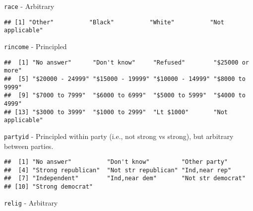 \documentclass[]{article}
\newenvironment{Shaded}{\begin{snugshade}}{\end{snugshade}}
\newcommand{\KeywordTok}[1]{\textcolor[rgb]{0.13,0.29,0.53}{\textbf{#1}}}
\newcommand{\OperatorTok}[1]{\textcolor[rgb]{0.81,0.36,0.00}{\textbf{#1}}}
\newcommand{\NormalTok}[1]{#1}
\theoremstyle{definition}
\theoremstyle{definition}
\theoremstyle{definition}
\theoremstyle{remark}
\begin{document}
\texttt{race} - Arbitrary

\begin{Shaded}
\end{Shaded}

\begin{verbatim}
## [1] "Other"          "Black"          "White"          "Not applicable"
\end{verbatim}

\texttt{rincome} - Principled

\begin{Shaded}
\end{Shaded}

\begin{verbatim}
##  [1] "No answer"      "Don't know"     "Refused"        "$25000 or more"
##  [5] "$20000 - 24999" "$15000 - 19999" "$10000 - 14999" "$8000 to 9999" 
##  [9] "$7000 to 7999"  "$6000 to 6999"  "$5000 to 5999"  "$4000 to 4999" 
## [13] "$3000 to 3999"  "$1000 to 2999"  "Lt $1000"       "Not applicable"
\end{verbatim}

\texttt{partyid} - Principled within party (i.e., not strong vs strong),
but arbitrary between parties.

\begin{Shaded}
\end{Shaded}

\begin{verbatim}
##  [1] "No answer"          "Don't know"         "Other party"       
##  [4] "Strong republican"  "Not str republican" "Ind,near rep"      
##  [7] "Independent"        "Ind,near dem"       "Not str democrat"  
## [10] "Strong democrat"
\end{verbatim}

\texttt{relig} - Arbitrary

\begin{Shaded}
\end{Shaded}
\end{document}
